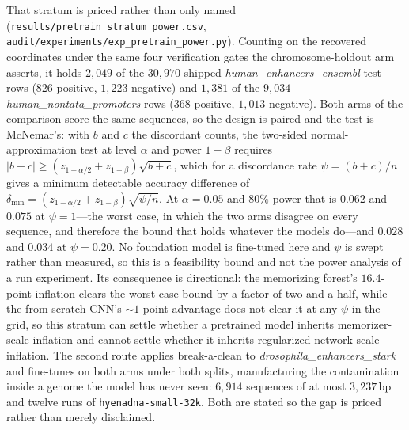 \documentclass[11pt,a4paper]{article}
\begin{document}
That stratum is priced rather than only named (\texttt{results/pretrain\_stratum\_power.csv},
\texttt{audit/experiments/exp\_pretrain\_power.py}). Counting on the recovered coordinates under the
same four verification gates the chromosome-holdout arm asserts, it holds $2{,}049$ of the
$30{,}970$ shipped \textit{human\_enhancers\_ensembl} test rows ($826$ positive, $1{,}223$ negative)
and $1{,}381$ of the $9{,}034$ \textit{human\_nontata\_promoters} rows ($368$ positive, $1{,}013$
negative). Both arms of the comparison score the same sequences, so the design is paired and the
test is McNemar's: with $b$ and $c$ the discordant counts, the two-sided normal-approximation test
at level $\alpha$ and power $1-\beta$ requires $|b-c|\ge(z_{1-\alpha/2}+z_{1-\beta})\sqrt{b+c}$,
which for a discordance rate $\psi=(b+c)/n$ gives a minimum detectable accuracy difference of
$\delta_{\min}=(z_{1-\alpha/2}+z_{1-\beta})\sqrt{\psi/n}$. At $\alpha=0.05$ and $80\%$ power that is
$0.062$ and $0.075$ at $\psi=1$---the worst case, in which the two arms disagree on every sequence,
and therefore the bound that holds whatever the models do---and $0.028$ and $0.034$ at
$\psi=0.20$. No foundation model is fine-tuned here and $\psi$ is swept rather than measured, so
this is a feasibility bound and not the power analysis of a run experiment. Its consequence is
directional: the memorizing forest's $16.4$-point inflation clears the worst-case bound by a factor
of two and a half, while the from-scratch CNN's ${\sim}1$-point advantage does not clear it at any
$\psi$ in the grid, so this stratum can settle whether a pretrained model inherits memorizer-scale
inflation and cannot settle whether it inherits regularized-network-scale inflation. The second
route applies
break-a-clean to \textit{drosophila\_enhancers\_stark} and fine-tunes on both arms under both
splits, manufacturing the contamination inside a genome the model has never seen: $6{,}914$
sequences of at most $3{,}237$\,bp and twelve runs of \texttt{hyenadna-small-32k}. Both are stated
so the gap is priced rather than merely disclaimed.
\end{document}
